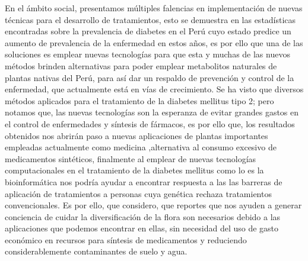 
En el ámbito social, presentamos múltiples falencias en implementación de nuevas técnicas para el desarrollo de tratamientos, esto se demuestra en las estadísticas encontradas sobre la prevalencia de diabetes en el Perú cuyo estado predice un aumento de prevalencia de la enfermedad en estos años, es por ello que una de las soluciones es emplear nuevas tecnologías para que esta y muchas de las nuevos métodos brinden alternativas para poder emplear metabolitos naturales de plantas nativas del Perú, para así dar un respaldo de prevención y control de la enfermedad, que actualmente está en vías de crecimiento.
Se ha visto que diversos métodos aplicados para el tratamiento de la diabetes mellitus tipo 2; pero notamos que, las nuevas tecnologías son la esperanza de evitar grandes gastos en el control de enfermedades y síntesis de fármacos, es por ello que, los resultados obtenidos nos abrirán paso a nuevas aplicaciones de plantas importantes empleadas actualmente como medicina ,alternativa al consumo excesivo de medicamentos sintéticos, finalmente al emplear de nuevas tecnologías computacionales en el tratamiento de la diabetes mellitus como lo es la bioinformática nos podría ayudar a encontrar respuesta a las las barreras de aplicación de tratamientos a personas cuya genética rechaza tratamientos convencionales.
Es por ello, que considero, que reportes que nos ayuden a generar conciencia de cuidar la diversificación de la flora son necesarios debido a las aplicaciones que podemos encontrar en ellas, sin necesidad del uso de gasto económico en recursos para síntesis de medicamentos y reduciendo considerablemente contaminantes de suelo y agua.

